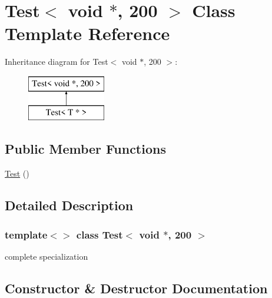\hypertarget{class_test_3_01void_01_5_00_01200_01_4}{}\section{Test$<$ void $\ast$, 200 $>$ Class Template Reference}
\label{class_test_3_01void_01_5_00_01200_01_4}
Inheritance diagram for Test$<$ void $\ast$, 200 $>$\+:\begin{figure}[H]
\begin{center}
\leavevmode
\includegraphics[height=2.000000cm]{class_test_3_01void_01_5_00_01200_01_4}
\end{center}
\end{figure}
\subsection*{Public Member Functions}
\begin{DoxyCompactItemize}
\item 
\mbox{\hyperlink{class_test_3_01void_01_5_00_01200_01_4_aef160085cc11406b872b45fa871c7692}{Test}} ()
\end{DoxyCompactItemize}


\subsection{Detailed Description}
\subsubsection*{template$<$$>$\newline
class Test$<$ void $\ast$, 200 $>$}

complete specialization 

\subsection{Constructor \& Destructor Documentation}
\mbox{\label{class_test_3_01void_01_5_00_01200_01_4_aef160085cc11406b872b45fa871c7692}} 
